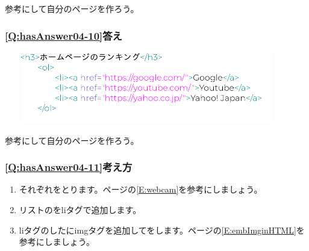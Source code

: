 \documentclass[a4paper,12pt]{jarticle}
\begin{document}
\bigskip

参考にして自分のページを作ろう。


\bigskip

\subsubsection{\bfseries
\ref*{Q:hasAnswer04-10}答え}


\centering
\includegraphics[width=12.448cm,height=3.129cm]{textbook-img241.png}
\flushleft

\bigskip

\centering
{}
\flushleft

\bigskip
参考にして自分のページを作ろう。

\clearpage\subsubsection{\bfseries
\ref*{Q:hasAnswer04-11}考え方}

\begin{enumerate}
  \item
        それぞれをとります。\pageref*{E:webcam}ページの\ref*{E:webcam}を参考にしましょう。
  \item リストのをliタグで追加します。
  \item
        liタグのしたにimgタグを追加してをします。\pageref*{E:embImginHTML}ページの\ref*{E:embImginHTML}を参考にしましょう。
\end{enumerate}
\centering
{}
\flushleft
\end{document}
